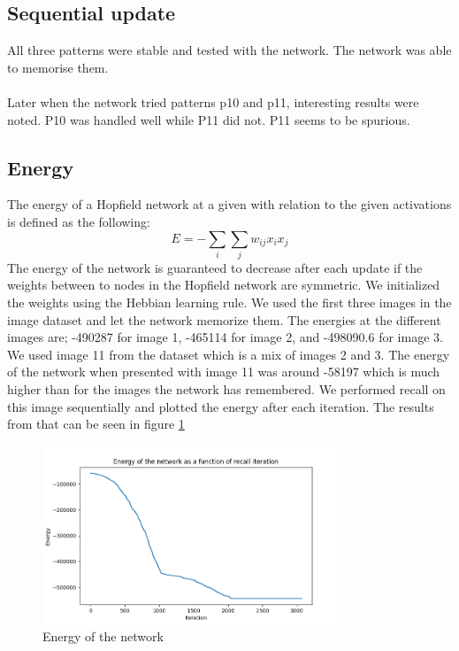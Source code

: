 \documentclass[a4paper]{article}
\begin{document}
\subsection{Sequential update}
All three patterns were stable and tested with the network. The network was able to memorise them. \\
\\Later when the network tried patterns p10 and p11, interesting results were noted. P10 was handled well while P11 did not. P11 seems to be spurious. \\

\subsection{Energy}
The energy of a Hopfield network at a given with relation to the given activations is defined as the following:
$$
E = -\sum_i\sum_j w_{ij}x_ix_j
$$
The energy of the network is guaranteed to decrease after each update if the weights between to nodes in the Hopfield network are symmetric. We initialized the weights using the Hebbian learning rule. We used the first three images in the image dataset and let the network memorize them. The energies at the different images are; -490287 for image 1, -465114 for image 2, and -498090.6 for image 3. We used image 11 from the dataset which is a mix of images 2 and 3. The energy of the network when presented with image 11 was around -58197 which is much higher than for the images the network has remembered. We performed recall on this image sequentially and plotted the energy after each iteration. The results from that can be seen in figure \ref{fig:energies}

\begin{figure}[ht]
    \centering
    \includegraphics[width=0.8\textwidth]{Labs/Lab 3/images/energy.png}
    \caption{Energy of the network}
    \label{fig:energies}
\end{figure}
\end{document}
